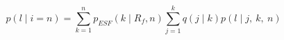 \documentclass[a4paper,10pt]{article}
\newcommand{\gc}[1]{{\it \color{red} (#1)} }
\begin{document}
\begin{equation}
p(l \mid i=n) =  \sum_{k=1}^{n}  p_{ESF}(k \mid R_f,n)  \sum_{j=1}^k q(j\mid k) p(l \mid j,~k, ~n)
\end{equation}
%
\end{document}
